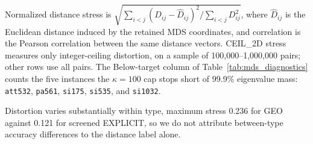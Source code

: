 \documentclass{article}
\begin{document}
Normalized distance stress is $\sqrt{\sum_{i<j}(D_{ij}-\hat D_{ij})^2/\sum_{i<j}D_{ij}^2}$, where $\hat D_{ij}$ is the Euclidean distance induced by the retained MDS coordinates, and correlation is the Pearson correlation between the same distance vectors. CEIL\_2D stress measures only integer-ceiling distortion, on a sample of 100{,}000--1{,}000{,}000 pairs; other rows use all pairs. The Below-target column of Table~\ref{tab:mds_diagnostics} counts the five instances the $\kappa=100$ cap stops short of 99.9\% eigenvalue mass: \texttt{att532}, \texttt{pa561}, \texttt{si175}, \texttt{si535}, and \texttt{si1032}.

\begin{table}[!ht]
\centering
\caption{Embedding diagnostics on the 23 screened instances; medians with [minimum, maximum].}
\label{tab:mds_diagnostics}
\end{table}

Distortion varies substantially within type, maximum stress 0.236 for GEO against 0.121 for screened EXPLICIT, so we do not attribute between-type accuracy differences to the distance label alone.
\end{document}
